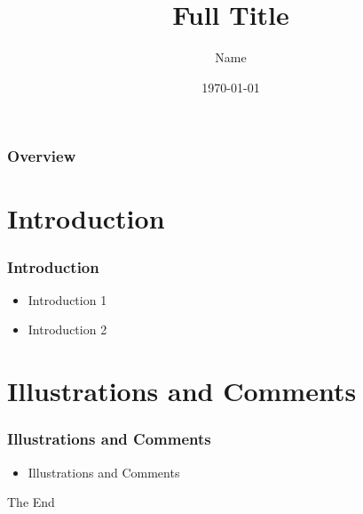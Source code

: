 \documentclass{beamer}
\title[Short Title]{Full Title} %
\author{Name} %
\institute[Short Institution] %
{
Full Institution \\ %
\medskip
\textcolor{blue}{yqlian.rol@gmail.com} %
}
\date{\today}
\begin{document}
\begin{frame}
\titlepage %
\thispagestyle{empty}
\addtocounter{framenumber}{-1}
\end{frame}

\begin{frame}
\frametitle{Overview} %
\tableofcontents %
\end{frame}


\section{Introduction} %

\begin{frame}
\frametitle{Introduction}
\begin{itemize}
\item Introduction 1
\item Introduction 2
\end{itemize}
\end{frame}


\section{Illustrations and Comments}


\begin{frame}
\frametitle{Illustrations and Comments}
\begin{itemize}
\item Illustrations and Comments
\end{itemize}
\end{frame}


\begin{frame}
\Huge{\centerline{The End}}
\end{frame}

\end{document}

